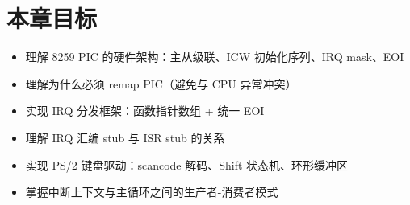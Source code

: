 \section{本章目标}

\begin{itemize}
  \item 理解 8259 PIC 的硬件架构：主从级联、ICW 初始化序列、IRQ mask、EOI
  \item 理解为什么必须 remap PIC（避免与 CPU 异常冲突）
  \item 实现 IRQ 分发框架：函数指针数组 + 统一 EOI
  \item 理解 IRQ 汇编 stub 与 ISR stub 的关系
  \item 实现 PS/2 键盘驱动：scancode 解码、Shift 状态机、环形缓冲区
  \item 掌握中断上下文与主循环之间的生产者-消费者模式
\end{itemize}


